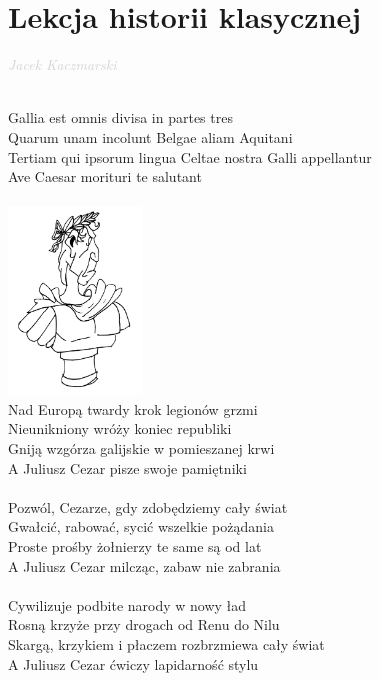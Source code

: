 \documentclass[a5paper, 10pt]{book}
\begin{document}
\newpage
\section{Lekcja historii klasycznej}\textcolor{lightgray}{\textit{Jacek Kaczmarski}}\\~\\
\begin{minipage}[t]{0.8\textwidth}
\hspace*{5mm}Gallia est omnis divisa in partes tres\\
\hspace*{5mm}Quarum unam incolunt Belgae aliam Aquitani\\
\hspace*{5mm}Tertiam qui ipsorum lingua Celtae nostra Galli appellantur\\
\hspace*{5mm}Ave Caesar morituri te salutant\\
\\
\includegraphics[height=5cm, right]{images/lekcja_historii_klasycznej.png}\vspace*{-5.05cm}\\
Nad Europą twardy krok legionów grzmi\\
Nieunikniony wróży koniec republiki\\
Gniją wzgórza galijskie w pomieszanej krwi\\
A Juliusz Cezar pisze swoje pamiętniki\\
\\
Pozwól, Cezarze, gdy zdobędziemy cały świat\\
Gwałcić, rabować, sycić wszelkie pożądania\\
Proste prośby żołnierzy te same są od lat\\
A Juliusz Cezar milcząc, zabaw nie zabrania\\
\\
Cywilizuje podbite narody w nowy ład\\
Rosną krzyże przy drogach od Renu do Nilu\\
Skargą, krzykiem i płaczem rozbrzmiewa cały świat\\
A Juliusz Cezar ćwiczy lapidarność stylu\\
\end{minipage}
\end{document}
